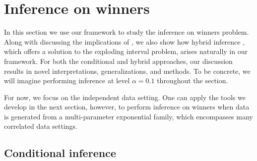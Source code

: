 \documentclass{article}
\begin{document}
\section{Inference on winners}
\label{sec:winner}

In this section we use our framework to study the inference on winners problem. Along with discussing the implications of , we also show how hybrid inference \citep{Andrews2023}, which offers a solution to the exploding interval problem, arises naturally in our framework. For both the conditional and hybrid approaches, our discussion results in novel interpretations, generalizations, and methods. To be concrete, we will imagine performing inference at level $\alpha = 0.1$ throughout the section.

For now, we focus on the independent data setting. One can apply the tools we develop in the next section, however, to perform inference on winners when data is generated from a multi-parameter exponential family, which encompasses many correlated data settings. 


\subsection{Conditional inference}
\end{document}
